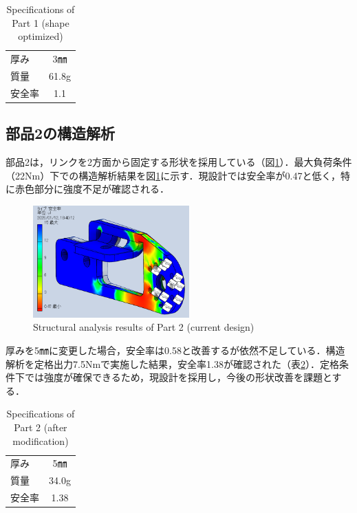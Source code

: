 \begin{table}[h]
  \centering
  \caption{Specifications of Part 1 (shape optimized)}
  \begin{tabular}{lc}
    \hline
    厚み & 3㎜ \\ 
    質量 & 61.8g \\ 
    安全率 & 1.1 \\ \hline
  \end{tabular}
  \label{tab:part1_spec_T3_80}
\end{table}

\subsection{部品2の構造解析}
部品2は，リンクを2方面から固定する形状を採用している（図\ref{fig:pitch}）．最大負荷条件（22Nm）下での構造解析結果を図\ref{fig:pitch}に示す．現設計では安全率が0.47と低く，特に赤色部分に強度不足が確認される．

\begin{figure}[h]
  \centering
  \includegraphics[width=6cm]{images/design/pitch.png}
  \caption{Structural analysis results of Part 2 (current design)}
  \label{fig:pitch}
\end{figure}

厚みを5㎜に変更した場合，安全率は0.58と改善するが依然不足している．構造解析を定格出力7.5Nmで実施した結果，安全率1.38が確認された（表\ref{tab:part2_spec}）．定格条件下では強度が確保できるため，現設計を採用し，今後の形状改善を課題とする．

\begin{table}[h]
  \centering
  \caption{Specifications of Part 2 (after modification)}
  \begin{tabular}{lc}
    \hline
    厚み & 5㎜ \\ 
    質量 & 34.0g \\ 
    安全率 & 1.38 \\ \hline
  \end{tabular}
  \label{tab:part2_spec}
\end{table}

\newpage